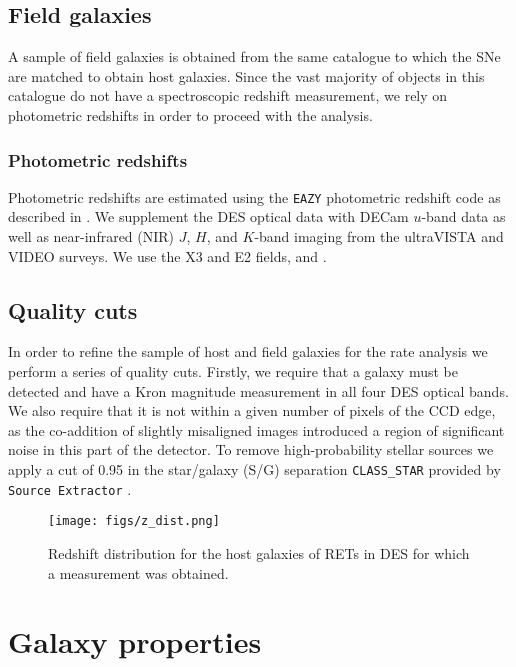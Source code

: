 \documentclass[fleqn,usenatbib]{mnras}
\begin{document}
\subsection{Field galaxies\label{subsec:field_sample}}
A sample of field galaxies is obtained from the same catalogue to which the SNe are matched to obtain host galaxies. Since the vast majority of objects in this catalogue do not have a spectroscopic redshift measurement, we rely on photometric redshifts in order to proceed with the analysis. 
\subsubsection{Photometric redshifts \label{subsubsec:photozs}}

Photometric redshifts are estimated using the \texttt{EAZY} photometric redshift code \citep{Brammer2008} as described in \citet{Amon2020}. We supplement the DES optical data with DECam $u$-band data as well as near-infrared (NIR) $J$, $H$, and $K$-band imaging from the ultraVISTA and VIDEO surveys. We use the X3 and E2 fields, and .

\subsection{Quality cuts \label{subsec:cuts}}

In order to refine the sample of host and field galaxies for the rate analysis we perform a series of quality cuts. Firstly, we require that a galaxy must be detected and have a Kron magnitude measurement in all four DES optical bands. We also require that it is not within a given number of pixels of the CCD edge, as the co-addition of slightly misaligned images introduced a region of significant noise in this part of the detector. To remove high-probability stellar sources we apply a cut of 0.95 in the star/galaxy (S/G) separation \texttt{CLASS\_STAR} provided by \texttt{Source Extractor} \citep{Bertin1996}. 

\begin{figure}
\texttt{[image: figs/z\_dist.png]}
\caption{Redshift distribution for the host galaxies of RETs in DES for which a measurement was obtained.
\label{fig:z_dist}}
\end{figure}

\section{Galaxy properties \label{sec:properties}}
\end{document}
